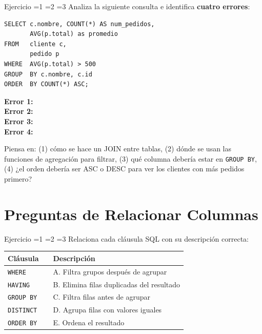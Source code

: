 \documentclass[12pt, a4paper]{article}
\newcommand{\blank}[1][4cm]{\underline{\hspace{#1}}}
\newcommand{\estrella}{{\color{Goldenrod}\faStarSolid}}
\newcommand{\estrellavacia}{{\color{gray!45}\faStarSolid}}
\newcommand{\nivel}[1]{%
  \ifnum#1=1\estrella\estrellavacia\estrellavacia\fi
  \ifnum#1=2\estrella\estrella\estrellavacia\fi
  \ifnum#1=3\estrella\estrella\estrella\fi
}
\newcounter{numej}
\newcommand{\ej}{\stepcounter{numej}\thenumej}
\begin{document}
\begin{ejercicio}{Ejercicio \ej}{\nivel{3}}
Analiza la siguiente consulta e identifica \textbf{cuatro errores}:

\begin{lstlisting}
SELECT c.nombre, COUNT(*) AS num_pedidos,
       AVG(p.total) as promedio
FROM   cliente c,
       pedido p
WHERE  AVG(p.total) > 500
GROUP  BY c.nombre, c.id
ORDER  BY COUNT(*) ASC;
\end{lstlisting}

\vspace{4pt}
\textbf{Error 1:} \blank[9cm]\\[6pt]
\textbf{Error 2:} \blank[9cm]\\[6pt]
\textbf{Error 3:} \blank[9cm]\\[6pt]
\textbf{Error 4:} \blank[9cm]

\begin{hint}
Piensa en: (1) cómo se hace un JOIN entre tablas,
(2) dónde se usan las funciones de agregación para filtrar,
(3) qué columna debería estar en \texttt{GROUP BY},
(4) ¿el orden debería ser ASC o DESC para ver los clientes
con más pedidos primero?
\end{hint}
\end{ejercicio}

\section{Preguntas de Relacionar Columnas}

\begin{ejercicio}{Ejercicio \ej}{\nivel{1}}
Relaciona cada cláusula SQL con su descripción correcta:

\vspace{6pt}
\begin{center}
\small
\renewcommand{\arraystretch}{1.5}
\begin{tabular}{@{} p{3.5cm} p{0.8cm} p{7cm} @{}}
  \toprule
  \textbf{Cláusula} & & \textbf{Descripción} \\
  \midrule
  \texttt{WHERE}    & \blank[0.6cm] & A. Filtra grupos después de agrupar \\
  \texttt{HAVING}   & \blank[0.6cm] & B. Elimina filas duplicadas del resultado \\
  \texttt{GROUP BY} & \blank[0.6cm] & C. Filtra filas antes de agrupar \\
  \texttt{DISTINCT} & \blank[0.6cm] & D. Agrupa filas con valores iguales \\
  \texttt{ORDER BY} & \blank[0.6cm] & E. Ordena el resultado \\
  \bottomrule
\end{tabular}
\end{center}
\end{ejercicio}
\end{document}
